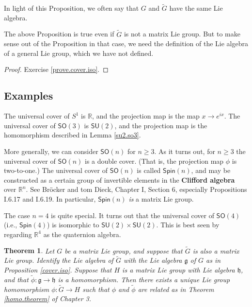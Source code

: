 \documentclass{amsbook}
\let \frak = \mathfrak
\theoremstyle{plain}
\newtheorem{theorem}{Theorem}
\numberwithin{equation}{chapter}
\numberwithin{theorem}{chapter}
\begin{document}
In light of this Proposition, we often say that $G$ and $\widetilde{G}$ have
the same Lie algebra.

The above Proposition is true even if $\widetilde{G}$ is not a matrix Lie
group. But to make sense out of the Proposition in that case, we need the
definition of the Lie algebra of a general Lie group, which we have not defined.

\begin{proof}
Exercise \ref{prove.cover.iso}.
\end{proof}

\subsection{Examples}

The universal cover of $S^{1}$ is $\mathbb{R}$, and the projection map is the
map $x\rightarrow e^{ix}$. The universal cover of $\mathsf{SO}(3)$ is
$\mathsf{SU}(2)$, and the projection map is the homomorphism described in
Lemma \ref{su2.so3}.

More generally, we can consider $\mathsf{SO}(n)$ for $n\geq3$. As it turns
out, for $n\geq3$ the universal cover of $\mathsf{SO}(n)$ is a double cover.
(That is, the projection map $\phi$ is two-to-one.) The universal cover of
$\mathsf{SO}(n)$ is called $\mathsf{Spin}(n)$, and may be constructed as a
certain group of invertible elements in the \textbf{Clifford algebra} over
$\mathbb{R}^{n}$. See Br\"ocker and tom Dieck, Chapter I, Section 6,
especially Propositions I.6.17 and I.6.19. In particular, $\mathsf{Spin}(n)$
\textit{is} a matrix Lie group.

The case $n=4$ is quite special. It turns out that the universal cover of
$\mathsf{SO}(4)$ (i.e., $\mathsf{Spin}(4)$) is isomorphic to $\mathsf{SU}%
(2)\times\mathsf{SU}(2)$. This is best seen by regarding $\mathbb{R}^{4}$ as
the quaternion algebra.

\begin{theorem}
\label{cover.homo}Let $G$ be a matrix Lie group, and suppose that
$\widetilde{G}$ is also a matrix Lie group. Identify the Lie algebra of
$\widetilde{G}$ with the Lie algebra $\frak{g}$ of $G$ as in Proposition
\ref{cover.iso}. Suppose that $H$ is a matrix Lie group with Lie algebra
$\frak{h}$, and that $\widetilde{\phi}:\frak{g}\rightarrow\frak{h}$ is a
homomorphism. Then there exists a unique Lie group homomorphism $\phi
:\widetilde{G}\rightarrow H$ such that $\phi$ and $\widetilde{\phi}$ are
related as in Theorem \ref{homo.theorem} of Chapter 3.
\end{theorem}
\end{document}
